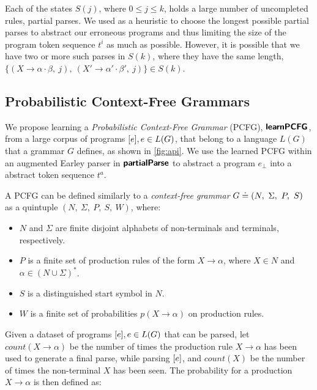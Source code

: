  Each of the states $S(j)$, where $0
\leq j \leq k$, holds a large number of uncompleted rules, \ie partial parses.
We used as a heuristic to choose the longest possible partial parses to abstract
our erroneous programs and thus limiting the size of the program token sequence
$t^i$ as much as possible. However, it is possible that we have two or more such
parses in $S(k)$, where they have the same length, \eg $\{(X \rightarrow \alpha
\cdot \beta,\ j),\ (X' \rightarrow \alpha' \cdot \beta',\ j)\} \in S(k)$.




\subsection{Probabilistic Context-Free Grammars}
\label{sec:prog-abstract:pcfg}
We propose learning a \emph{Probabilistic Context-Free Grammar} (PCFG),
$\bm{\mathsf{learnPCFG}}$, from a large corpus of programs $[e], e \in L(G)$, that
belong to a language $L(G)$ that a grammar $G$ defines, as shown in
\autoref{fig:api}. We use the learned PCFG within an augmented Earley parser in
$\bm{\mathsf{partialParse}}$ to abstract a program $e_{\bot}$ into a abstract token sequence
$t^a$.

A PCFG can be defined similarly to a \emph{context-free grammar} $G \doteq (N,\
\Sigma,\ P,\ S)$ as a quintuple $(N,\ \Sigma,\ P,\ S,\ W)$, where:
\begin{itemize}
    \item $N$ and $\Sigma$ are finite disjoint alphabets of non-terminals and
    terminals, respectively.
    \item $P$ is a finite set of production rules of the form $X \rightarrow
    \alpha$, where $X \in N$ and $\alpha \in (N \cup \Sigma)^{\ast}$.
    \item $S$ is a distinguished start symbol in $N$.
    \item $W$ is a finite set of probabilities $p(X \rightarrow \alpha)$ on
    production rules.
\end{itemize}

Given a dataset of programs $[e], e \in L(G)$ that can be parsed, let
$count(X \rightarrow \alpha)$ be the number of times the production rule $X
\rightarrow \alpha$ has been used to generate a final parse, while parsing
$[e]$, and $count(X)$ be the number of times the non-terminal $X$ has been
seen. The probability for a production $X \rightarrow \alpha$ is then defined
as:


